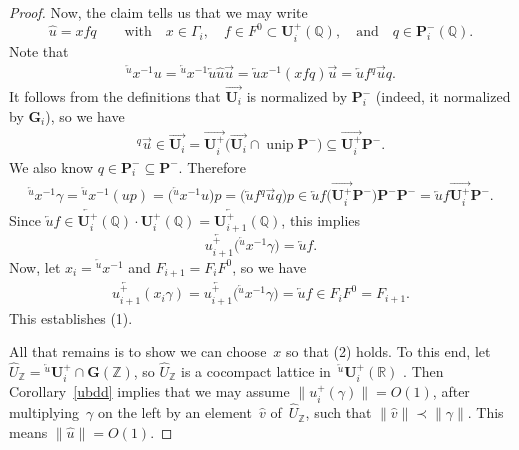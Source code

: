 \documentclass[pdftex]{sigma}
\newcommand{\QQ}{\mathbb{Q}}
\newcommand{\RR}{\mathbb{R}}
\newcommand{\ZZ}{\mathbb{Z}}
\newcommand{\Ga}{\mathbf{G}}
\newcommand{\Pa}{\mathbf{P}}
\newcommand{\Ua}{\mathbf{U}}
\DeclareMathOperator{\unip}{unip}
\newcommand{\ra}{\overrightarrow}
\newcommand{\la}{\overleftarrow}
\numberwithin{equation}{section}
\theoremstyle{definition}
\begin{document}
\begin{proof}
Now, the claim tells us that we may write
	\[ \widehat{u} = x f q \qquad \text{with} \quad x \in \Gamma_i, \quad f \in F^0 \subset \Ua^+_i(\QQ), \quad \text{and} \quad q \in \Pa_i^-(\QQ) .\]
Note that
	\begin{gather*}
	 {}^{\overleftarrow{u}} \! \! x^{-1} u
	 = {}^{\overleftarrow{u}} \! \! x^{-1} \overleftarrow{u} \widehat{u} \overrightarrow{u}
	= \overleftarrow{u} x^{-1} (x f q) \overrightarrow{u}
	= \overleftarrow{u} f {}^q \overrightarrow{u} q
	. \end{gather*}
It follows from the definitions that $\ra{\Ua_i}$ is normalized by $\Pa_i^-$ (indeed, it normalized by $\Ga_i$), so we have
	\begin{gather} \label{quplus}
	{}^q \overrightarrow{u}
	\in \ra{\Ua_i}
	= \ra{\Ua_i^+} \big(\ra{\Ua_i} \cap \unip \Pa^-\big)
	\subseteq \ra{\Ua_i^+} \Pa^-
	. \end{gather}
We also know $q \in \Pa_i^- \subseteq \Pa^-$. Therefore
	\begin{gather} \label{usgamma}
	{}^{\overleftarrow{u}} \! \! x^{-1} \gamma
	= {}^{\overleftarrow{u}} \! \! x^{-1} (u p)
	= \big({}^{\overleftarrow{u}} \! \! x^{-1} u\big) p
	= \big(\overleftarrow{u} f {}^q \overrightarrow{u} q\big) p
	\in \overleftarrow{u} f \big(\ra{\Ua_i^+} \Pa^-\big) \Pa^- \Pa^-
	= \overleftarrow{u} f \ra{\Ua_i^+} \Pa^-
	. \end{gather}
Since $\overleftarrow{u} f \in \la{\Ua^+_i}(\QQ) \cdot \Ua^+_i(\QQ) = \la{\Ua^+_{i+1}}(\QQ)$, this implies
	\[ \la{u^+_{i+1}} \big( {}^{\overleftarrow{u}} \! \! x^{-1} \gamma\big) = \overleftarrow{u} f .\]
Now, let $x_i = {}^{\overleftarrow{u}} \! \! x^{-1}$ and $F_{i+1} = F_i F^0$, so we have
	\begin{gather*}
	\la{u^+_{i+1}} ( x_i \gamma)
	= \la{u^+_{i+1}} \big( {}^{\overleftarrow{u}} \! \! x^{-1} \gamma\big)
	= \overleftarrow{u} f
	\in F_i F^0
	= F_{i+1}
	. \end{gather*}
This establishes (1).

All that remains is to show we can choose~$x$ so that (2) holds.
To this end, let $\widehat{U}_\ZZ = {}^{\overleftarrow{u}}\Ua^+_i \cap \Ga(\ZZ)$, so $\widehat{U}_\ZZ$ is a cocompact lattice in~${}^{\overleftarrow{u}}\Ua^+_i(\RR)$ \cite[Theorem~4.12, p.~210]{MR1278263}. Then Corollary~\ref{ubdd} implies that we may assume
	$\| u^+_i(\gamma) \| = O(1) $,
after multiplying~$\gamma$ on the left by an element~$\widehat{v}$ of~$\widehat{U}_\ZZ$, such that $\| \widehat{v} \| \prec \| \gamma \|$. This means $\| \widehat u \| = O(1)$.


\end{proof}
\end{document}
